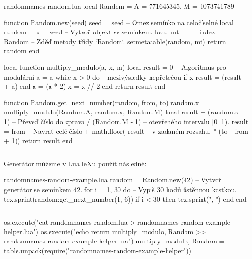 \documentclass{csbulletin}
\let\exampleoutput\emph
\newcommand\myinputminted[3][]{%
  \inputminted[#1]{#2}{#3}%
}
\newcommand\myinputminted[3][]{%
  \inputminted[#1]{#2}{code-placeholder.#2}%
}
\begin{document}
\begin{filecontents}{randomnames-random.lua}
local Random = { A = 771645345, M = 1073741789 }

function Random.new(seed)
  seed = seed                      -- Omez semínko na celočíselné
  local random = { x = seed }      -- Vytvoř objekt se semínkem.
  local mt = { __index = Random }  -- Zděď metody třídy `Random`.
  setmetatable(random, mt)
  return random
end

local function multiply_modulo(a, x, m)
  local result = 0                 -- Algoritmus pro modulární
  a = a %
  while x > 0 do                   -- mezivýsledky nepřetečou
    if x %
      result = (result + a) %
    end
    a = (a * 2) %
    x = x // 2
  end
  return result
end

function Random.get_next_number(random, from, to)
  random.x = multiply_modulo(Random.A, random.x, Random.M)
  local result = (random.x - 1)    -- Převeď číslo do zprava
               / (Random.M - 1)    -- otevřeného intervalu [0; 1).
  result = from                    -- Navrať celé číslo
         + math.floor( result      -- v zadaném rozsahu.
                     * (to - from + 1))
  return result
end

\end{filecontents}
\myinputminted{lua}{randomnames-random.lua}

Generátor můžeme v Lua\TeX u použít následně:

\begin{filecontents}{randomnames-random-example.lua}
random = Random.new(42)        -- Vytvoř generátor se semínkem 42.
for i = 1, 30 do               -- Vypiš 30 hodů 6stěnnou kostkou.
  tex.sprint(random:get_next_number(1, 6))
  if i < 30 then tex.sprint(", ") end
end
\end{filecontents}
\myinputminted[linenos=false]{lua}{randomnames-random-example.lua}

\noindent
\begin{luacode*}
os.execute("cat randomnames-random.lua > randomnames-random-example-helper.lua")
os.execute("echo return {multiply_modulo, Random} >> randomnames-random-example-helper.lua")
multiply_modulo, Random = table.unpack(require("randomnames-random-example-helper"))
\end{luacode*}
\exampleoutput{}
\end{document}
